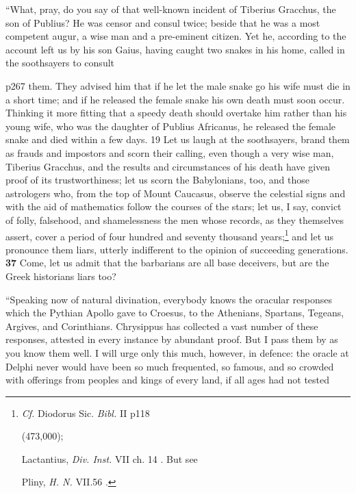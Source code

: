``What, pray, do you say of that well-known incident of Tiberius Gracchus, the son of Publius? He was censor and consul twice; beside that he was a most competent augur, a wise man and a pre-eminent citizen. Yet he, according to the account left us by his son Gaius, having caught two snakes in his home, called in the soothsayers to consult

p267 them. They advised him that if he let the male snake go his wife must die in a short time; and if he released the female snake his own death must soon occur. Thinking it more fitting that a speedy death should overtake him rather than his young wife, who was the daughter of Publius Africanus, he released the female snake and died within a few days. 19 Let us laugh at the soothsayers, brand them as frauds and impostors and scorn their calling, even though a very wise man, Tiberius Gracchus, and the results and circumstances of his death have given proof of its trustworthiness; let us scorn the Babylonians, too, and those astrologers who, from the top of Mount Caucasus, observe the celestial signs and with the aid of mathematics follow the courses of the stars; let us, I say, convict of folly, falsehood, and shamelessness the men whose records, as they themselves assert, cover a period of four hundred and seventy thousand years;\texthebrew{}\footnote{\emph{Cf.} Diodorus Sic. \emph{Bibl.} II p118

(473,000);

Lactantius, \emph{Div. Inst.} VII ch. 14 . But see

Pliny, \emph{H. N.} VII.56 .

} and let us pronounce them liars, utterly indifferent to the opinion of succeeding generations. \textbf{37} Come, let us admit that the barbarians are all base deceivers, but are the Greek historians liars too?

``Speaking now of natural divination, everybody knows the oracular responses which the Pythian Apollo gave to Croesus, to the Athenians, Spartans, Tegeans, Argives, and Corinthians. Chrysippus has collected a vast number of these responses, attested in every instance by abundant proof. But I pass them by as you know them well. I will urge only this much, however, in defence: the oracle at Delphi never would have been so much frequented, so famous, and so crowded with offerings from peoples and kings of every land, if all ages had not tested

